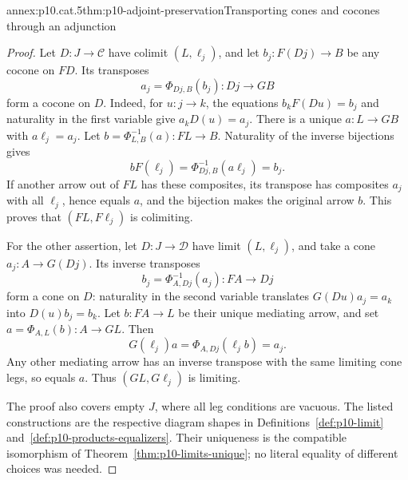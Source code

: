 \begin{annexitem}{annex:p10.cat.5}{thm:p10-adjoint-preservation}{Transporting cones and cocones through an adjunction}
\begin{proof}
Let \(D:J\to\mathcal C\) have colimit \((L,\ell_j)\), and let
\(b_j:F(Dj)\to B\) be any cocone on \(F D\).
Its transposes
\[
                         a_j=\Phi_{D j,B}(b_j):D j\to G B
\]
form a cocone on \(D\).
Indeed, for \(u:j\to k\), the equations
\(b_k F(Du)=b_j\) and naturality in the first variable give
\(a_k D(u)=a_j\).
There is a unique \(a:L\to G B\) with \(a\ell_j=a_j\).
Let \(b=\Phi^{-1}_{L,B}(a):F L\to B\).
Naturality of the inverse bijections gives
\[
                  b F(\ell_j)=\Phi^{-1}_{D j,B}(a\ell_j)=b_j.
\]
If another arrow out of \(F L\) has these composites, its
transpose has composites \(a_j\) with all \(\ell_j\), hence
equals \(a\), and the bijection makes the original arrow \(b\).
This proves that \((F L,F\ell_j)\) is colimiting.

For the other assertion, let \(D:J\to\mathcal D\) have limit
\((L,\ell_j)\), and take a cone \(a_j:A\to G(Dj)\).
Its inverse transposes
\[
                         b_j=\Phi^{-1}_{A,D j}(a_j):F A\to D j
\]
form a cone on \(D\): naturality in the second variable
translates \(G(Du)a_j=a_k\) into \(D(u)b_j=b_k\).
Let \(b:F A\to L\) be their unique mediating arrow, and set
\(a=\Phi_{A,L}(b):A\to G L\).
Then
\[
                       G(\ell_j)a=\Phi_{A,D j}(\ell_j b)=a_j.
\]
Any other mediating arrow has an inverse transpose with the
same limiting cone legs, so equals \(a\).
Thus \((G L,G\ell_j)\) is limiting.

The proof also covers empty \(J\), where all leg conditions
are vacuous.  The listed constructions are the respective
diagram shapes in Definitions~\ref{def:p10-limit}
and~\ref{def:p10-products-equalizers}.
Their uniqueness is the compatible isomorphism of
Theorem~\ref{thm:p10-limits-unique}; no literal equality of
different choices was needed.
\end{proof}
\end{annexitem}

